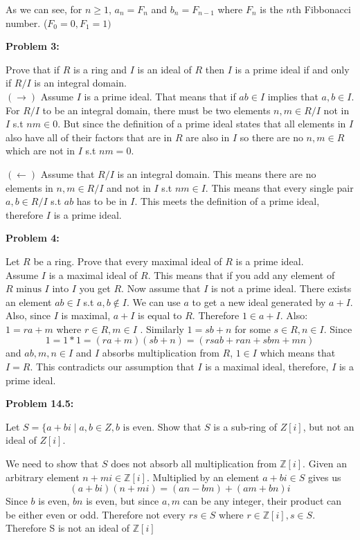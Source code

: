 \documentclass[a4paper, 11pt]{article}
\begin{document}
    As we can see, for $n \geq 1$, $a_n = F_n$ and $b_n = F_{n-1}$ where $F_n$ is the $n$th Fibbonacci number. ($F_0 = 0, F_1 = 1)$

\newpage
\noindent\textbf{Problem 3:}
    
    Prove that if $R$ is a ring and $I$ is an ideal of $R$ then $I$ is a prime ideal if and only if $R/I$ is an integral domain.\\
    
    $(\rightarrow )$ Assume $I$ is a prime ideal. That means that if $ab \in I$ implies that $a,b\in I$. For $R/I$ to be an integral domain, there must be two elements $n,m\in R/I$ not in $I$ s.t $nm\in 0$. But since the definition of a prime ideal states that all elements in $I$ also have all of their factors that are in $R$ are also in $I$ so there are no $n,m\in R$ which are not in $I$ s.t $nm=0$.
    
    $(\leftarrow )$ Assume  that $R/I$ is an integral domain. This means there are no elements in $n,m\in R/I$ and not in $I$ s.t $nm\in I$. This means that every single pair $a,b\in R/I$ s.t $ab$ has to be in $I$. This meets the definition of a prime ideal, therefore $I$ is a prime ideal.
    
\noindent\textbf{Problem 4:}
    
    Let $R$ be a ring. Prove that every maximal ideal of $R$ is a prime ideal.\\
    
    Assume $I$ is a maximal ideal of $R$. This means that if you add any element of $R \text{ minus } I$ into $I$ you get $R$. Now assume that $I$ is not a prime ideal. There exists an element $ab\in I$ s.t $a,b\not\in I$. We can use $a$ to get a new ideal generated by $a+I$. Also, since $I$ is maximal, $a+I$ is equal to $R$. Therefore $1\in a+I$. Also: $1=ra+m$ where $r\in R, m\in I$ . Similarly $1=sb+n$ for some $s\in R,n\in I$. Since $$1=1*1=(ra+m)(sb+n)=(rsab+ran+sbm+mn)$$
    and $ab,m,n\in I$ and $I$ absorbs multiplication from $R$, $1\in I$ which means that $I=R$. This contradicts our assumption that $I$ is a maximal ideal, therefore, $I$ is a prime ideal.
    
\noindent\textbf{Problem 14.5:}
    
    Let $S=\{a+bi \mid a,b\in Z, b \text{ is even}$. Show that $S$ is a sub-ring of $Z[i]$, but not an ideal of $Z[i]$.
    
    We need to show that $S$ does not absorb all multiplication from $\mathbb{Z}[i]$. Given an arbitrary element  $n+mi\in\mathbb{Z}[i]$. Multiplied by an element $a+bi\in S$ gives us $$(a+bi)(n+mi)=(an-bm)+(am+bn)i$$
    Since $b$ is even, $bn$ is even, but since $a,m$ can be any integer, their product can be either even or odd. Therefore not every $rs\in S$ where $r\in\mathbb{Z}[i], s\in S$. Therefore S is not an ideal of $\mathbb{Z}[i]$
       
\end{document}
